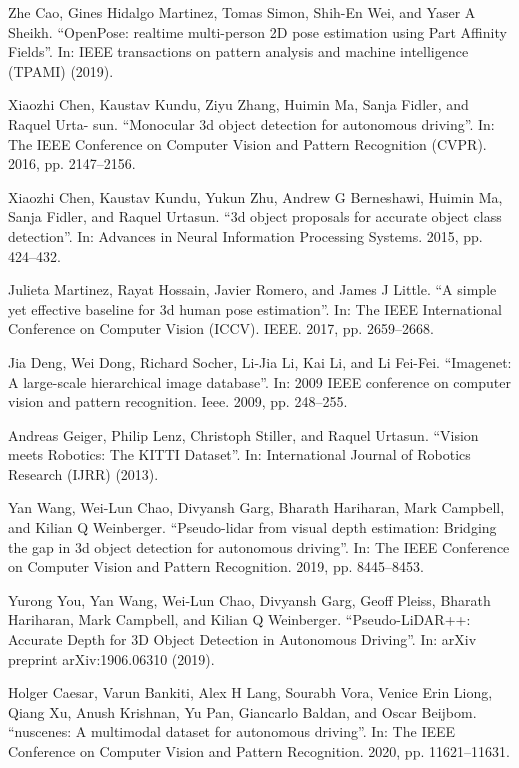 \documentclass[english, LaM, oneside]{sapthesis}%
\begin{document}
\begin{thebibliography}{99}
 Zhe Cao, Gines Hidalgo Martinez, Tomas Simon, Shih-En Wei, and Yaser A Sheikh. “OpenPose: realtime multi-person 2D pose estimation using Part Affinity Fields”. In: IEEE transactions on pattern analysis and machine intelligence (TPAMI) (2019).

 Xiaozhi Chen, Kaustav Kundu, Ziyu Zhang, Huimin Ma, Sanja Fidler, and Raquel Urta- sun. “Monocular 3d object detection for autonomous driving”. In: The IEEE Conference on Computer Vision and Pattern Recognition (CVPR). 2016, pp. 2147–2156.

 Xiaozhi Chen, Kaustav Kundu, Yukun Zhu, Andrew G Berneshawi, Huimin Ma, Sanja Fidler, and Raquel Urtasun. “3d object proposals for accurate object class detection”. In: Advances in Neural Information Processing Systems. 2015, pp. 424–432.

 Julieta Martinez, Rayat Hossain, Javier Romero, and James J Little. “A simple yet effective baseline for 3d human pose estimation”. In: The IEEE International Conference on Computer Vision (ICCV). IEEE. 2017, pp. 2659–2668.

 Jia Deng, Wei Dong, Richard Socher, Li-Jia Li, Kai Li, and Li Fei-Fei. “Imagenet: A large-scale hierarchical image database”. In: 2009 IEEE conference on computer vision and pattern recognition. Ieee. 2009, pp. 248–255.

 Andreas Geiger, Philip Lenz, Christoph Stiller, and Raquel Urtasun. “Vision meets Robotics: The KITTI Dataset”. In: International Journal of Robotics Research (IJRR) (2013).

 Yan Wang, Wei-Lun Chao, Divyansh Garg, Bharath Hariharan, Mark Campbell, and Kilian Q Weinberger. “Pseudo-lidar from visual depth estimation: Bridging the gap in 3d object detection for autonomous driving”. In: The IEEE Conference on Computer Vision and Pattern Recognition. 2019, pp. 8445–8453.

 Yurong You, Yan Wang, Wei-Lun Chao, Divyansh Garg, Geoff Pleiss, Bharath Hariharan, Mark Campbell, and Kilian Q Weinberger. “Pseudo-LiDAR++: Accurate Depth for 3D Object Detection in Autonomous Driving”. In: arXiv preprint arXiv:1906.06310 (2019).

 Holger Caesar, Varun Bankiti, Alex H Lang, Sourabh Vora, Venice Erin Liong, Qiang Xu, Anush Krishnan, Yu Pan, Giancarlo Baldan, and Oscar Beijbom. “nuscenes: A multimodal dataset for autonomous driving”. In: The IEEE Conference on Computer Vision and Pattern Recognition. 2020, pp. 11621–11631.


\end{thebibliography}
\end{document}
